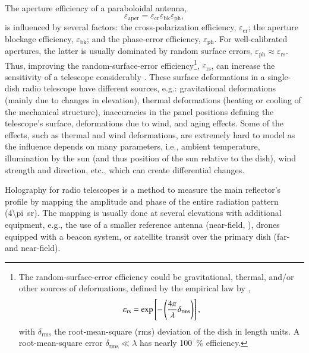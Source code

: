 \documentclass[
    ]
    {aa}
\begin{document}
    The aperture efficiency of a paraboloidal antenna,
    \begin{equation}
    \varepsilon_\text{aper}=\varepsilon_\text{cr}\varepsilon_\text{bk}\varepsilon_\text{ph},
    \label{eq:aperture_efficiency}
    \end{equation}
    is influenced by several factors: the cross-polarization efficiency, $\varepsilon_\text{cr}$; the aperture blockage efficiency, $\varepsilon_\text{bk}$; and the phase-error efficiency, $\varepsilon_\text{ph}$. For well-calibrated apertures, the latter is usually dominated by random surface errors, $\varepsilon_\text{ph}\approx \varepsilon_\text{rs}$. Thus, improving the random-surface-error efficiency\footnote{The random-surface-error efficiency could be gravitational, thermal, and/or other sources of deformations, defined by the empirical law by \cite{1966IEEEP..54..633R}, \begin{equation} \varepsilon_\text{rs} = \exp\sbr{-\del{\frac{4\pi}{\lambda}\delta_\text{rms}}},\label{eq:e_rs} \end{equation}
    with $\delta_\text{rms}$ the root-mean-square (rms) deviation of the dish in length units. A root-mean-square error $\delta_\text{rms}\ll\lambda$ has nearly \SI{100}{\percent} efficiency.
    }, $\varepsilon_\text{rs}$, can increase the sensitivity of a telescope considerably \citep[see][Chapter~7]{stutzman1998antenna}.
    These surface deformations in a single-dish radio telescope have different sources, e.g.: gravitational deformations (mainly due to changes in elevation), thermal deformations (heating or cooling of the mechanical structure), inaccuracies in the panel positions defining the telescope's surface, deformations due to wind, and aging effects. Some of the effects, such as thermal and wind deformations, are extremely hard to model as the influence depends on many parameters, i.e., ambient temperature, illumination by the sun (and thus position of the sun relative to the dish), wind strength and direction, etc., which can create differential changes.

    Holography for radio telescopes is a method to measure the main reflector's profile by mapping the amplitude and phase of the entire radiation pattern (\SI[parse-numbers=false]{4\pi}{\steradian}). The mapping is usually done at several elevations with additional equipment, e.g., the use of a smaller reference antenna (near-field, \citealt{2007IAPM...49...24B}), drones equipped with a beacon system, or satellite transit over the primary dish (far- and near-field).
\end{document}
